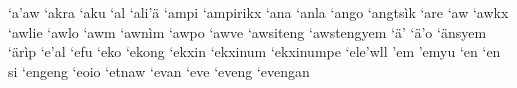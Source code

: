 `a'aw\hspace{2mm}
`akra\hspace{2mm}
`aku\hspace{2mm}
`al\hspace{2mm}
`ali'ä\hspace{2mm}
`ampi\hspace{2mm}
`ampirikx\hspace{2mm}
`ana\hspace{2mm}
`anla\hspace{2mm}
`ango\hspace{2mm}
`angtsìk\hspace{2mm}
`are\hspace{2mm}
`aw\hspace{2mm}
`awkx\hspace{2mm}
`awlie\hspace{2mm}
`awlo\hspace{2mm}
`awm\hspace{2mm}
`awnìm\hspace{2mm}
`awpo\hspace{2mm}
`awve\hspace{2mm}
`awsiteng\hspace{2mm}
`awstengyem\hspace{2mm}
`ä'\hspace{2mm}
`ä'o\hspace{2mm}
`änsyem\hspace{2mm}
`ärìp\hspace{2mm}
`e'al\hspace{2mm}
`efu\hspace{2mm}
`eko\hspace{2mm}
`ekong\hspace{2mm}
`ekxin\hspace{2mm}
`ekxinum\hspace{2mm}
`ekxinumpe\hspace{2mm}
`ele'wll\hspace{2mm}
'em\hspace{2mm}
'emyu\hspace{2mm}
`en\hspace{2mm}
`en si\hspace{2mm}
`engeng\hspace{2mm}
`eoio\hspace{2mm}
`etnaw\hspace{2mm}
`evan\hspace{2mm}
`eve\hspace{2mm}
`eveng\hspace{2mm}
`evengan\hspace{2mm}
